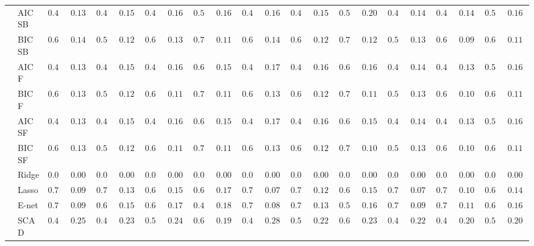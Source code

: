 \begin{tabular}{ll|ll|llllll|llllll|llllll}
 & AIC SB  & $0.428$ & $0.1364$ & $0.452$ & $0.1521$ & $0.480$ & $0.1633$ & $0.588$ & $0.1677$ & $0.412$ & $0.1653$ & $0.464$ & $0.1554$ & $0.580$ & $0.2020$ & $0.432$ & $0.1497$ & $0.474$ & $0.1468$ & $0.562$ & $0.1698$ \\
 & BIC SB  & $0.608$ & $0.1447$ & $0.586$ & $0.1279$ & $0.628$ & $0.1393$ & $0.708$ & $0.1152$ & $0.626$ & $0.1411$ & $0.642$ & $0.1281$ & $0.718$ & $0.1242$ & $0.596$ & $0.1333$ & $0.622$ & $0.0980$ & $0.656$ & $0.1104$ \\
 & AIC F  & $0.432$ & $0.1355$ & $0.454$ & $0.1527$ & $0.496$ & $0.1669$ & $0.614$ & $0.1589$ & $0.432$ & $0.1746$ & $0.494$ & $0.1644$ & $0.654$ & $0.1604$ & $0.432$ & $0.1497$ & $0.498$ & $0.1318$ & $0.586$ & $0.1664$ \\
 & BIC F  & $0.616$ & $0.1383$ & $0.588$ & $0.1266$ & $0.640$ & $0.1172$ & $0.720$ & $0.1101$ & $0.636$ & $0.1345$ & $0.650$ & $0.1251$ & $0.732$ & $0.1145$ & $0.598$ & $0.1318$ & $0.626$ & $0.1011$ & $0.664$ & $0.1133$ \\
 & AIC SF  & $0.432$ & $0.1355$ & $0.454$ & $0.1527$ & $0.496$ & $0.1669$ & $0.614$ & $0.1589$ & $0.432$ & $0.1746$ & $0.494$ & $0.1644$ & $0.658$ & $0.1539$ & $0.432$ & $0.1497$ & $0.498$ & $0.1318$ & $0.586$ & $0.1664$ \\
 & BIC SF  & $0.616$ & $0.1383$ & $0.588$ & $0.1266$ & $0.640$ & $0.1172$ & $0.720$ & $0.1101$ & $0.636$ & $0.1345$ & $0.650$ & $0.1251$ & $0.738$ & $0.1090$ & $0.598$ & $0.1318$ & $0.626$ & $0.1011$ & $0.664$ & $0.1133$ \\
 & Ridge  & $0.000$ & $0.0000$ & $0.000$ & $0.0000$ & $0.000$ & $0.0000$ & $0.000$ & $0.0000$ & $0.000$ & $0.0000$ & $0.000$ & $0.0000$ & $0.000$ & $0.0000$ & $0.000$ & $0.0000$ & $0.000$ & $0.0000$ & $0.000$ & $0.0000$ \\
 & Lasso  & $0.762$ & $0.0930$ & $0.720$ & $0.1363$ & $0.654$ & $0.1553$ & $0.614$ & $0.1735$ & $0.774$ & $0.0787$ & $0.740$ & $0.1287$ & $0.658$ & $0.1565$ & $0.774$ & $0.0733$ & $0.746$ & $0.1096$ & $0.690$ & $0.1432$ \\
 & E-net  & $0.760$ & $0.0943$ & $0.682$ & $0.1533$ & $0.618$ & $0.1777$ & $0.472$ & $0.1832$ & $0.770$ & $0.0823$ & $0.732$ & $0.1340$ & $0.562$ & $0.1698$ & $0.762$ & $0.0930$ & $0.740$ & $0.1189$ & $0.642$ & $0.1689$ \\
 & SCAD  & $0.492$ & $0.2549$ & $0.426$ & $0.2338$ & $0.516$ & $0.2415$ & $0.676$ & $0.1965$ & $0.466$ & $0.2801$ & $0.560$ & $0.2238$ & $0.648$ & $0.2380$ & $0.466$ & $0.2221$ & $0.492$ & $0.2097$ & $0.582$ & $0.2091$ \\

\end{tabular}
